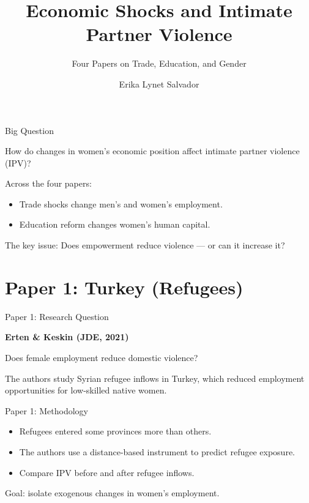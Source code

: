 \documentclass[11pt,aspectratio=169]{beamer}
\title{Economic Shocks and Intimate Partner Violence}
\subtitle{Four Papers on Trade, Education, and Gender}
\author{Erika Lynet Salvador}
\date{}
\begin{document}

\begin{frame}
\titlepage
\end{frame}


\begin{frame}{Big Question}

How do changes in women's economic position affect
intimate partner violence (IPV)?

\medskip

Across the four papers:

\begin{itemize}
    \item Trade shocks change men’s and women’s employment.
    \item Education reform changes women’s human capital.
\end{itemize}

\medskip

The key issue:
Does empowerment reduce violence — or can it increase it?

\end{frame}

\section{Paper 1: Turkey (Refugees)}

\begin{frame}{Paper 1: Research Question}

\textbf{Erten \& Keskin (JDE, 2021)}

\medskip

Does female employment reduce domestic violence?

\medskip

The authors study Syrian refugee inflows in Turkey,
which reduced employment opportunities for low-skilled native women.

\end{frame}

\begin{frame}{Paper 1: Methodology}

\begin{itemize}
    \item Refugees entered some provinces more than others.
    \item The authors use a distance-based instrument to predict refugee exposure.
    \item Compare IPV before and after refugee inflows.
\end{itemize}

\medskip

Goal: isolate exogenous changes in women’s employment.

\end{frame}
\end{document}
